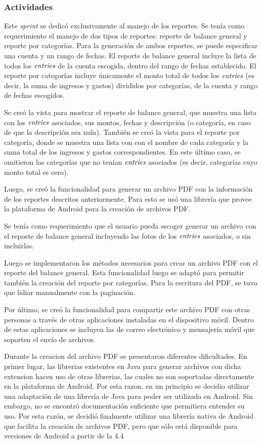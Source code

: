 \subsubsection{Actividades}
Este \textit{sprint} se dedicó exclusivamente al manejo de los reportes. Se tenía como requerimiento el manejo de dos tipos de reportes: reporte de balance general y reporte por categorías. Para la generación de ambos reportes, se puede especificar una cuenta y un rango de fechas. El reporte de balance general incluye la lista de todos los $\textit{entries}$ de la cuenta escogida, dentro del rango de fechas establecido. El reporte por categorías incluye únicamente el monto total de todos los $\textit{entries}$ (es decir, la suma de ingresos y gastos) divididos por categorías, de la cuenta y rango de fechas escogidos.

Se creó la vista para mostrar el reporte de balance general, que muestra una lista con los $\textit{entries}$ asociados, sus montos, fechas y descripción (o categoría, en caso de que la descripción sea nula). También se creó la vista para el reporte por categoría, donde se muestra una lista con con el nombre de cada categoría y la suma total de los ingresos y gastos correspondientes. En este último caso, se omitieron las categorías que no tenían $\textit{entries}$ asociados (es decir, categorías cuyo monto total es cero).

Luego, se creó la funcionalidad para generar un archivo PDF con la información de los reportes descritos anteriormente. Para esto se usó una librería que provee la plataforma de Android para la creación de archivos PDF.  

Se tenía como requerimiento que el usuario pueda escoger generar un archivo con el reporte de balance general incluyendo las fotos de los $\textit{entries}$ asociados, o sin incluirlas.

Luego se implementaron los métodos necesarios para crear un archivo PDF con el reporte del balance general. Esta funcionalidad luego se adaptó para permitir también la creación del reporte por categorías. Para la escritura del PDF, se tuvo que lidiar manualmente con la paginación. 

Por último, se creó la funcionalidad para compartir este archivo PDF con otras personas a través de otras aplicaciones instaladas en el dispositivo móvil. Dentro de estas aplicaciones se incluyen las de correo electrónico y mensajería móvil que soporten el envío de archivos.

Durante la creacion del archivo PDF se presentaron diferentes dificultades. En primer lugar, las librerias existentes en Java para generar archivos con dicha extension hacen uso de otras librerias, las cuales no son soportadas directamente en la plataforma de Android. Por esta razon, en un principio se decidio utilizar una adaptación de una librería de Java para poder ser utilizada en Android. Sin embargo, no se encontró documentación suficiente que permitiera entender su uso. Por esta razón, se decidió finalmente utilizar una librería nativa de Android que facilita la creación de archivos PDF, pero que sólo está disponible para versiones de Android a partir de la 4.4


